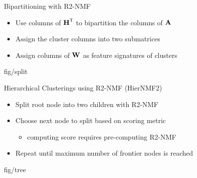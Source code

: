 \documentclass{beamer}
\begin{document}
\begin{frame}{Bipartitioning with R2-NMF}
    \begin{itemize}
        \item Use columns of $\M{H}^\Tra$ to bipartition the columns of $\M{A}$
        \item Assign the cluster columns into two submatrices
        \item Assign columns of $\M{W}$ as feature signatures of clusters
    \end{itemize}
    \begin{adjustbox}{max totalsize={.7\textwidth}{.6\textheight},center}
        {fig/split}
    \end{adjustbox}
\end{frame}

\begin{frame}{Hierarchical Clusterings using R2-NMF (HierNMF2)}
    \begin{itemize}
        \item Split root node into two children with R2-NMF
        \item Choose next node to split based on scoring metric
        \begin{itemize}
        		\item computing score requires pre-computing R2-NMF
	\end{itemize}
        \item Repeat until maximum number of frontier nodes is reached
    \end{itemize}
    \begin{adjustbox}{max totalsize={.7\textwidth}{.6\textheight},center}
        {fig/tree}
    \end{adjustbox}
\end{frame}
\end{document}
